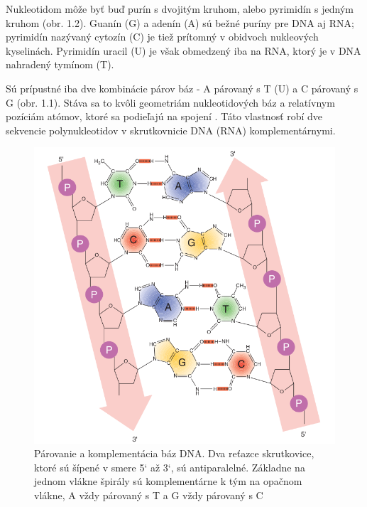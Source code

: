 Nukleotidom môže byť buď purín s dvojitým kruhom, alebo pyrimidín s jedným kruhom (obr. 1.2).
Guanín (G) a adenín (A) sú bežné puríny pre DNA aj RNA; pyrimidín nazývaný cytozín (C) je tiež prítomný v obidvoch nukleových kyselinách.
Pyrimidín uracil (U) je však obmedzený iba na RNA, ktorý je v DNA nahradený tymínom (T).

Sú prípustné iba dve kombinácie párov báz - A párovaný s T (U) a C párovaný s G (obr. 1.1).
Stáva sa to kvôli geometriám nukleotidových báz a relatívnym pozíciám atómov, ktoré sa podieľajú na spojení \cite{MolecularGenetics}.
Táto vlastnosť robí dve sekvencie polynukleotidov v skrutkovnicie DNA (RNA) komplementárnymi. 

\begin{figure}[!ht]
	\centering
	\includegraphics[width=.85\textwidth]{figures/nucleotides.png}
	\caption{Párovanie a komplementácia báz DNA. Dva reťazce skrutkovice, ktoré sú šípené v smere 5` až 3`, sú antiparalelné. Základne na jednom vlákne špirály
	sú komplementárne k tým na opačnom vlákne, A vždy párovaný s T a G vždy párovaný s C \label{o:nucleotide}}
\end{figure}

